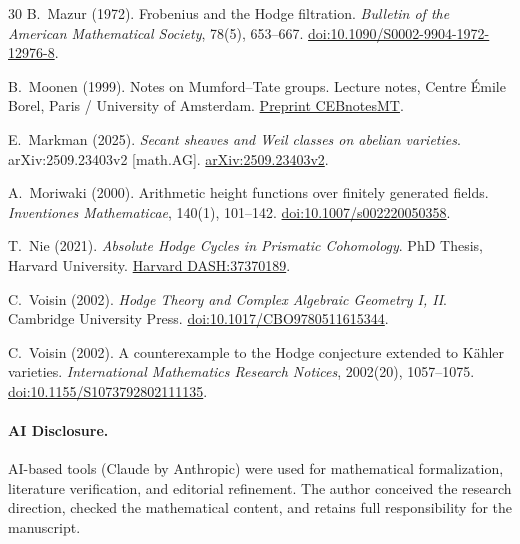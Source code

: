 \documentclass[aps,prd,twocolumn,superscriptaddress,nofootinbib]{revtex4-2}
\makeatletter
\theoremstyle{definition}
\theoremstyle{remark}
\let\auto@bib\@empty
\makeatother
\begin{document}
\begin{thebibliography}{30}
B.~Mazur (1972).
Frobenius and the Hodge filtration.
\textit{Bulletin of the American Mathematical Society}, 78(5), 653--667.
\href{https://doi.org/10.1090/S0002-9904-1972-12976-8}{doi:10.1090/S0002-9904-1972-12976-8}.

B.~Moonen (1999).
Notes on Mumford--Tate groups.
Lecture notes, Centre \'Emile Borel, Paris / University of Amsterdam.
\href{https://www.math.ru.nl/~bmoonen/Lecturenotes/CEBnotesMT.pdf}{Preprint CEBnotesMT}.

E.~Markman (2025).
\textit{Secant sheaves and Weil classes on abelian varieties}.
arXiv:2509.23403v2 [math.AG].
\href{https://arxiv.org/abs/2509.23403}{arXiv:2509.23403v2}.

A.~Moriwaki (2000).
Arithmetic height functions over finitely generated fields.
\textit{Inventiones Mathematicae}, 140(1), 101--142.
\href{https://doi.org/10.1007/s002220050358}{doi:10.1007/s002220050358}.

T.~Nie (2021).
\textit{Absolute Hodge Cycles in Prismatic Cohomology}.
PhD Thesis, Harvard University.
\href{https://nrs.harvard.edu/URN-3:HUL.INSTREPOS:37370189}{Harvard DASH:37370189}.

C.~Voisin (2002).
\textit{Hodge Theory and Complex Algebraic Geometry I, II}.
Cambridge University Press.
\href{https://doi.org/10.1017/CBO9780511615344}{doi:10.1017/CBO9780511615344}.

C.~Voisin (2002).
A counterexample to the Hodge conjecture extended to K\"ahler varieties.
\textit{International Mathematics Research Notices}, 2002(20), 1057--1075.
\href{https://doi.org/10.1155/S1073792802111135}{doi:10.1155/S1073792802111135}.

\end{thebibliography}

\paragraph*{AI Disclosure.}
AI-based tools (Claude by Anthropic) were used for mathematical formalization, literature verification, and editorial refinement. The author conceived the research direction, checked the mathematical content, and retains full responsibility for the manuscript.

\makeatletter
\let\test@bbl@sw\false@sw
\let\auto@bib\@empty
\makeatother
\end{document}
